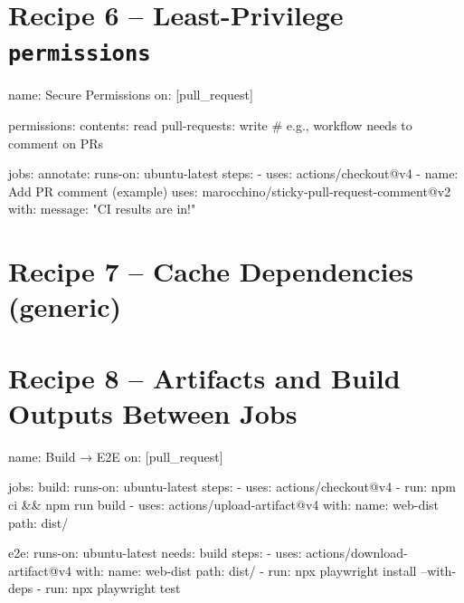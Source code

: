 \documentclass[11pt]{article}
\begin{document}
\newpage
\section{Recipe 6 – Least-Privilege \texttt{permissions}}
\begin{listing}[H]
\caption{Lock down \texttt{GITHUB\_TOKEN} scopes}
\begin{yamlcode}
name: Secure Permissions
on: [pull_request]

permissions:
  contents: read
  pull-requests: write   # e.g., workflow needs to comment on PRs

jobs:
  annotate:
    runs-on: ubuntu-latest
    steps:
      - uses: actions/checkout@v4
      - name: Add PR comment (example)
        uses: marocchino/sticky-pull-request-comment@v2
        with:
          message: "CI results are in!"
\end{yamlcode}
\end{listing}

\newpage
\section{Recipe 7 – Cache Dependencies (generic)}
\begin{listing}[H]
\caption{Generic caching with a robust key and restore keys}
\end{listing}

\newpage
\section{Recipe 8 – Artifacts and Build Outputs Between Jobs}
\begin{listing}[H]
\caption{Upload in one job, download in a dependent job}
\begin{yamlcode}
name: Build → E2E
on: [pull_request]

jobs:
  build:
    runs-on: ubuntu-latest
    steps:
      - uses: actions/checkout@v4
      - run: npm ci && npm run build
      - uses: actions/upload-artifact@v4
        with:
          name: web-dist
          path: dist/

  e2e:
    runs-on: ubuntu-latest
    needs: build
    steps:
      - uses: actions/download-artifact@v4
        with:
          name: web-dist
          path: dist/
      - run: npx playwright install --with-deps
      - run: npx playwright test
\end{yamlcode}
\end{listing}
\end{document}
